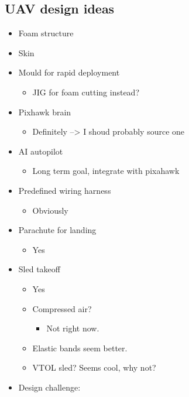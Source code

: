 \documentclass[11pt]{article}
\providecommand{\tightlist}{%
      \setlength{\itemsep}{0pt}\setlength{\parskip}{0pt}}
\begin{document}
    \hypertarget{uav-design-ideas}{%
\subsection{UAV design ideas}\label{uav-design-ideas}}

\begin{itemize}
\tightlist
\item
  Foam structure
\item
  Skin
\item
  Mould for rapid deployment

  \begin{itemize}
  \tightlist
  \item
    JIG for foam cutting instead?
  \end{itemize}
\item
  Pixhawk brain

  \begin{itemize}
  \tightlist
  \item
    Definitely --\textgreater{} I shoud probably source one
  \end{itemize}
\item
  AI autopilot

  \begin{itemize}
  \tightlist
  \item
    Long term goal, integrate with pixahawk
  \end{itemize}
\item
  Predefined wiring harness

  \begin{itemize}
  \tightlist
  \item
    Obviously
  \end{itemize}
\item
  Parachute for landing

  \begin{itemize}
  \tightlist
  \item
    Yes
  \end{itemize}
\item
  Sled takeoff

  \begin{itemize}
  \tightlist
  \item
    Yes
  \item
    Compressed air?

    \begin{itemize}
    \tightlist
    \item
      Not right now.
    \end{itemize}
  \item
    Elastic bands seem better.
  \item
    VTOL sled? Seems cool, why not?
  \end{itemize}
\item
  Design challenge:


\end{itemize}
\end{document}

